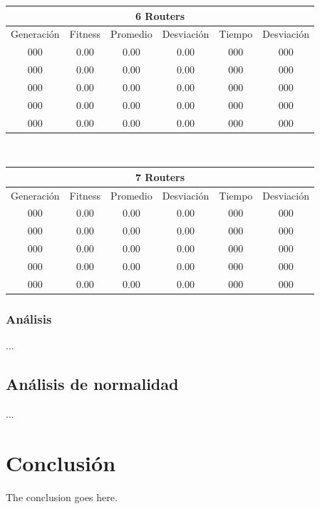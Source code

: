 \documentclass[journal]{IEEEtran}
\begin{document}
\begin{table}[h]
\begin{tabular}{|c||c|c|c||c|c|}
\hline
\multicolumn{6}{|c|}{6 Routers}\\
\hline
Generación & Fitness & Promedio & Desviación & Tiempo & Desviación \\
\hline
000 & 0.00 & 0.00 & 0.00 & 000 & 000 \\
000 & 0.00 & 0.00 & 0.00 & 000 & 000 \\
000 & 0.00 & 0.00 & 0.00 & 000 & 000 \\
000 & 0.00 & 0.00 & 0.00 & 000 & 000 \\
000 & 0.00 & 0.00 & 0.00 & 000 & 000 \\
\hline
\end{tabular}
\\[2ex]

\begin{tabular}{|c||c|c|c||c|c|}
\hline
\multicolumn{6}{|c|}{7 Routers}\\
\hline
Generación & Fitness & Promedio & Desviación & Tiempo & Desviación \\
\hline
000 & 0.00 & 0.00 & 0.00 & 000 & 000 \\
000 & 0.00 & 0.00 & 0.00 & 000 & 000 \\
000 & 0.00 & 0.00 & 0.00 & 000 & 000 \\
000 & 0.00 & 0.00 & 0.00 & 000 & 000 \\
000 & 0.00 & 0.00 & 0.00 & 000 & 000 \\
\hline
\end{tabular}

\label{tab:evaluation}
\end{table}

\subsubsection*{Análisis}

...

\subsection{Análisis de normalidad}

...

\section{Conclusión}

The conclusion goes here.

\newpage
\end{document}
